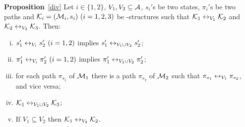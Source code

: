 \documentclass{article}
\begin{document}
 \noindent\textbf{Proposition}~\ref{div}
 Let $i\in \{1,2\}$, $V_1,V_2\subseteq\cal A$, $s_i'$s be two states,
   $\pi_i'$s be two paths
 and ${\cal K}_i=({\cal M}_i,s_i)~(i=1,2,3)$ be \MPK-structures
  such that
 ${\cal K}_1\leftrightarrow_{V_1}{\cal K}_2$ and ${\cal K}_2\leftrightarrow_{V_2}{\cal K}_3$.
  Then:
  \begin{enumerate}[(i)]
   \item $s_1'\leftrightarrow_{V_i}s_2'~(i=1,2)$ implies $s_1'\leftrightarrow_{V_1\cup V_2}s_2'$;
   \item $\pi_1'\leftrightarrow_{V_i}\pi_2'~(i=1,2)$ implies $\pi_1'\leftrightarrow_{V_1\cup V_2}\pi_2'$;
   \item for each path $\pi_{s_1}$ of ${\cal M}_1$ there is a path $\pi_{s_2}$  of ${\cal M}_2$ such that $\pi_{s_1} \leftrightarrow_{V_1} \pi_{s_2}$, and vice versa;
   \item ${\cal K}_1\leftrightarrow_{V_1\cup V_2}{\cal K}_3$;
   \item If $V_1 \subseteq V_2$ then ${\cal K}_1 \leftrightarrow_{V_2} {\cal K}_2$.
  \end{enumerate}
\end{document}
